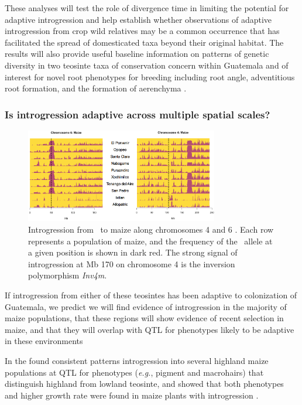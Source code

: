These analyses will test the role of divergence time in limiting the potential for adaptive introgression and help establish whether observations of adaptive introgression from crop wild relatives may be a common occurrence that has facilitated the spread of domesticated taxa beyond their original habitat.
The results will also provide useful baseline information on patterns of genetic diversity in two teosinte taxa of conservation concern within Guatemala and of interest for novel root phenotypes for breeding including root angle, adventitious root formation, and the formation of aerenchyma \citep{omori2007qtl,mano2007breeding}. 

\subsubsection{Is introgression adaptive across multiple spatial scales?}
\label{sss:scale}

\begin{figure}[t]
  \centering
   \includegraphics[width=0.75\textwidth]{same_regions}
    \caption{ Introgression from \zm\ to maize along chromosomes 4 and 6 \citep{Hufford2013}. Each row represents a population of maize, and the frequency of the \zm\ allele at a given position is shown in dark red. The strong signal of introgression at Mb 170 on chromosome 4 is the inversion polymorphism \emph{Inv4m}.} 
\label{fig:sameregions}
\end{figure} 

If introgression from either of these teosintes has been adaptive to colonization of Guatemala, we predict we will find evidence of introgression in the majority of maize populations, that these regions will show evidence of recent selection in maize, and that they will overlap with QTL for phenotypes likely to be adaptive in these environments 


 In the  found consistent patterns introgression into several highland maize populations at QTL for phenotypes (\emph{e.g.}, pigment and macrohairs) that distinguish highland \zm{} from lowland \zp{} teosinte, and showed that both \zm{} phenotypes and higher growth rate were found in maize plants with \zm{}  introgression \citep{Hufford2013}.

